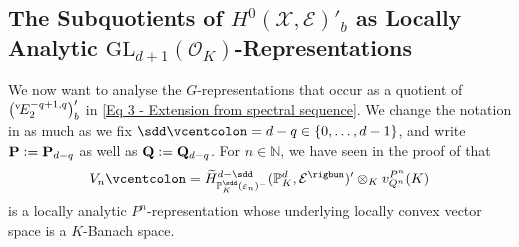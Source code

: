 \documentclass[a4paper, reqno, 10pt]{amsart}
\theoremstyle{definition}
\numberwithin{equation}{section}
\newcommand{\defeq}{\vcentcolon=}
\newcommand{\GL}{{\mathrm{GL}}}
\newcommand{\BN}{{\mathbb {N}}}
\newcommand{\BP}{{\mathbb {P}}}
\newcommand{\CE}{{\mathcal {E}}}
\newcommand{\CO}{{\mathcal {O}}}
\newcommand{\CX}{{\mathcal {X}}}
\newcommand{\bP}{{\mathrm{\bf P}}}
\newcommand{\bQ}{{\mathrm{\bf Q}}}
\begin{document}
\subsection{The Subquotients of $H^0(\CX,\CE)'_b$ as Locally Analytic $\GL_{d+1}(\CO_K)$-Re\-pre\-sen\-ta\-tions}


We now want to analyse the $G$-representations that occur as a quotient of $\big( {}^{\rm v}\! E_2^{-q+1,q}\big)'_b$ in \eqref{Eq 3 - Extension from spectral sequence}.
We change the notation in as much as we fix $\sdd \defeq d-q \in \{0,\ldots,d-1\}$, and write $\bP \defeq \bP_{d-q}$ as well as $\bQ \defeq \bQ_{d-q}$.
For $n\in \BN$, we have seen in the proof of  that 
\begin{equation}\label{Eq 3 - Definition of V_n}
	V_n \defeq \widetilde{H}^{d-\sdd}_{\BP_K^\sdd(\varepsilon_n)^-} (\BP_K^d, \CE^\rigbun)' \otimes_K v^{P^n}_{Q^n}(K)
\end{equation}
is a locally analytic $P^n$-representation whose underlying locally convex vector space is a $K$-Banach space.
\end{document}
